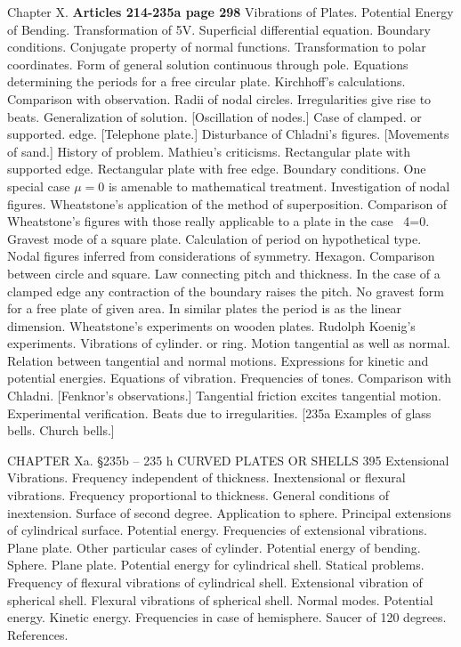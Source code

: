 Chapter X. \textbf{Articles 214-235a page 298}
Vibrations of Plates. Potential Energy of Bending. Transformation of 5V.
Superficial differential equation. Boundary conditions. Conjugate property of
normal functions. Transformation to polar coordinates. Form of general solution
continuous through pole. Equations determining the periods for a free
circular plate. Kirchhoff’s calculations.  Comparison with observation. Radii
of nodal circles. Irregularities give rise to beats. Generalization of
solution.
[Oscillation of nodes.]
Case of clamped. or supported. edge.
[Telephone plate.]
Disturbance of Chladni’s figures.
[Movements of sand.]
History of problem.  Mathieu’s criticisms. Rectangular plate with
supported edge. Rectangular plate with free edge. Boundary conditions. One
special case \(\mu = 0\) is amenable to mathematical treatment.  Investigation
of nodal figures. Wheatstone’s application of the method of superposition.
Comparison of Wheatstone’s figures with those really applicable to a plate in
the case ~4=0. Gravest mode of a square plate. Calculation of period on
hypothetical type. Nodal figures inferred from considerations of symmetry.
Hexagon. Comparison between circle and square.  Law connecting pitch and
thickness. In the case of a clamped edge any contraction of the boundary raises
the pitch. No gravest form for a free plate of given area. In similar plates
the period is as the linear dimension.  Wheatstone’s experiments on wooden
plates. Rudolph Koenig’s experiments. Vibrations of cylinder. or ring.  Motion
tangential as well as normal. Relation between tangential and normal motions.
Expressions for kinetic and potential energies. Equations of vibration.
Frequencies of tones. Comparison with Chladni.
[Fenknor’s observations.]
Tangential friction excites
tangential motion. Experimental verification. Beats due to irregularities.
[235a Examples of glass bells.  Church bells.]


CHAPTER Xa.
§235b -- 235 h CURVED PLATES OR SHELLS 395
Extensional Vibrations. Frequency independent of thickness. Inextensional
or flexural vibrations. Frequency proportional to thickness.
General conditions of inextension. Surface of second degree. Application to
sphere. Principal extensions of cylindrical surface. Potential energy.
Frequencies of extensional vibrations. Plane plate. Other
particular cases of cylinder. Potential energy of bending. Sphere.
Plane plate. Potential energy for cylindrical shell. Statical problems.
Frequency of flexural vibrations of cylindrical shell. Extensional
vibration of spherical shell. Flexural vibrations of spherical shell.
Normal modes. Potential energy. Kinetic energy. Frequencies in case
of hemisphere. Saucer of 120 degrees. References.

